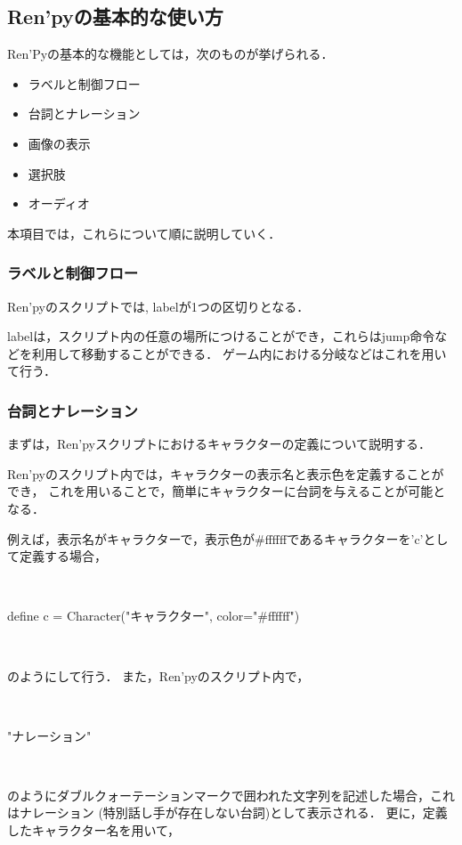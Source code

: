 \subsection{Ren'pyの基本的な使い方}
  
  Ren'Pyの基本的な機能としては，次のものが挙げられる．

  \begin{itemize}
    \item ラベルと制御フロー
    \item 台詞とナレーション
    \item 画像の表示
    \item 選択肢
    \item オーディオ
  \end{itemize}

  本項目では，これらについて順に説明していく．

  \subsubsection{ラベルと制御フロー}

    Ren'pyのスクリプトでは, labelが1つの区切りとなる．
    
    labelは，スクリプト内の任意の場所につけることができ，これらはjump命令などを利用して移動することができる．
    ゲーム内における分岐などはこれを用いて行う．

  \subsubsection{台詞とナレーション}

    まずは，Ren'pyスクリプトにおけるキャラクターの定義について説明する．

    Ren'pyのスクリプト内では，キャラクターの表示名と表示色を定義することができ，
    これを用いることで，簡単にキャラクターに台詞を与えることが可能となる．

    例えば，表示名がキャラクターで，表示色が\#ffffffであるキャラクターを'c'として定義する場合，

    ~

    define c = Character("キャラクター", color="\#ffffff")

    ~

    のようにして行う．
    また，Ren'pyのスクリプト内で，

    ~

    "ナレーション"

    ~

    のようにダブルクォーテーションマークで囲われた文字列を記述した場合，これはナレーション
    (特別話し手が存在しない台詞)として表示される．
    更に，定義したキャラクター名を用いて，

